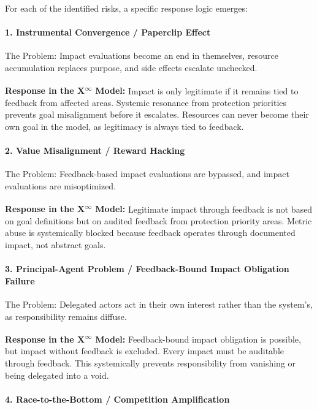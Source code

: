 \documentclass[12pt,a4paper]{article}
\begin{document}
For each of the identified risks, a specific response logic emerges:

\paragraph{1. Instrumental Convergence / Paperclip Effect}

The Problem:  
Impact evaluations become an end in themselves, resource accumulation replaces purpose, and side effects escalate unchecked.

\textbf{Response in the X\textsuperscript{\(\infty\)} Model:}  
Impact is only legitimate if it remains tied to feedback from affected areas.  
Systemic resonance from protection priorities prevents goal misalignment before it escalates.  
Resources can never become their own goal in the model, as legitimacy is always tied to feedback.

\paragraph{2. Value Misalignment / Reward Hacking}

The Problem:  
Feedback-based impact evaluations are bypassed, and impact evaluations are misoptimized.

\textbf{Response in the X\textsuperscript{\(\infty\)} Model:}  
Legitimate impact through feedback is not based on goal definitions but on audited feedback from protection priority areas.  
Metric abuse is systemically blocked because feedback operates through documented impact, not abstract goals.

\paragraph{3. Principal-Agent Problem / Feedback-Bound Impact Obligation Failure}

The Problem:  
Delegated actors act in their own interest rather than the system’s, as responsibility remains diffuse.

\textbf{Response in the X\textsuperscript{\(\infty\)} Model:}  
Feedback-bound impact obligation is possible, but impact without feedback is excluded.  
Every impact must be auditable through feedback.  
This systemically prevents responsibility from vanishing or being delegated into a void.

\paragraph{4. Race-to-the-Bottom / Competition Amplification}
\end{document}
